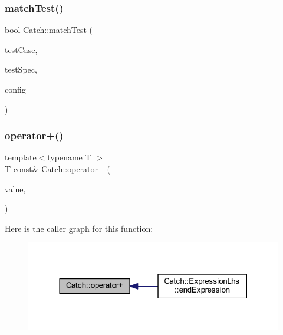 \hypertarget{namespace_catch_aadef80fbc6bc84589777a462770cef49}{}\label{namespace_catch_aadef80fbc6bc84589777a462770cef49} 
\subsubsection{\texorpdfstring{match\+Test()}{matchTest()}}
{\footnotesize\ttfamily bool Catch\+::match\+Test (\begin{DoxyParamCaption}\item[{\hyperlink{class_catch_1_1_test_case}{Test\+Case} const \&}]{test\+Case,  }\item[{Test\+Spec const \&}]{test\+Spec,  }\item[{I\+Config const \&}]{config }\end{DoxyParamCaption})}

\hypertarget{namespace_catch_a5e95b3c47a7618db3649dc39b0bb9004}{}\label{namespace_catch_a5e95b3c47a7618db3649dc39b0bb9004} 
\subsubsection{\texorpdfstring{operator+()}{operator+()}}
{\footnotesize\ttfamily template$<$typename T $>$ \\
T const\& Catch\+::operator+ (\begin{DoxyParamCaption}\item[{T const \&}]{value,  }\item[{\hyperlink{struct_catch_1_1_stream_end_stop}{Stream\+End\+Stop}}]{ }\end{DoxyParamCaption})}

Here is the caller graph for this function\+:\nopagebreak
\begin{figure}[H]
\begin{center}
\leavevmode
\includegraphics[width=318pt]{namespace_catch_a5e95b3c47a7618db3649dc39b0bb9004_icgraph}
\end{center}
\end{figure}
\hypertarget{namespace_catch_a6ec18b5054d7fdfdde861c580b082995}{}\label{namespace_catch_a6ec18b5054d7fdfdde861c580b082995} 
